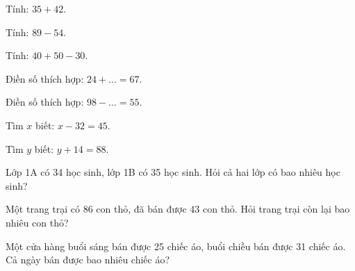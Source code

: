 \begin{ex}
Tính: $35 + 42$.
\end{ex}

\begin{ex}
Tính: $89 - 54$.
\end{ex}

\begin{ex}
Tính: $40 + 50 - 30$.
\end{ex}

\begin{ex}
Điền số thích hợp: $24 + \dots = 67$.
\end{ex}

\begin{ex}
Điền số thích hợp: $98 - \dots = 55$.
\end{ex}

\begin{ex}
Tìm $x$ biết: $x - 32 = 45$.
\end{ex}

\begin{ex}
Tìm $y$ biết: $y + 14 = 88$.
\end{ex}

\begin{ex}
Lớp 1A có 34 học sinh, lớp 1B có 35 học sinh. Hỏi cả hai lớp có bao nhiêu học sinh?
\end{ex}

\begin{ex}
Một trang trại có 86 con thỏ, đã bán được 43 con thỏ. Hỏi trang trại còn lại bao nhiêu con thỏ?
\end{ex}

\begin{ex}
Một cửa hàng buổi sáng bán được 25 chiếc áo, buổi chiều bán được 31 chiếc áo. Cả ngày bán được bao nhiêu chiếc áo?
\end{ex}

